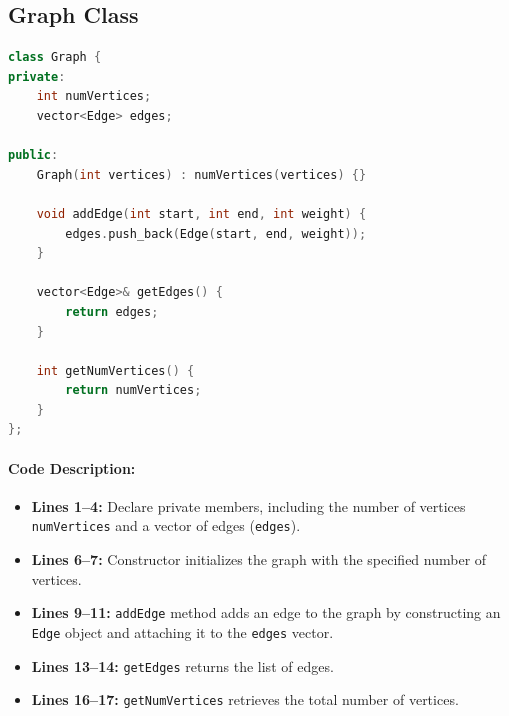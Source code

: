 \documentclass[a4paper,12pt]{article}
\begin{document}
\subsection{Graph Class}
\begin{lstlisting}[language=C++, caption=Graph Class Definition]
class Graph {
private:
    int numVertices;
    vector<Edge> edges;

public:
    Graph(int vertices) : numVertices(vertices) {}

    void addEdge(int start, int end, int weight) {
        edges.push_back(Edge(start, end, weight));
    }

    vector<Edge>& getEdges() {
        return edges;
    }

    int getNumVertices() {
        return numVertices;
    }
};
\end{lstlisting}

\paragraph{Code Description:}
\begin{itemize}
    \item \textbf{Lines 1--4:} Declare private members, including the number of vertices \texttt{numVertices} and a vector of edges (\texttt{edges}).
    \item \textbf{Lines 6--7:} Constructor initializes the graph with the specified number of vertices.
    \item \textbf{Lines 9--11:} \texttt{addEdge} method adds an edge to the graph by constructing an \texttt{Edge} object and attaching it to the \texttt{edges} vector.
    \item \textbf{Lines 13--14:} \texttt{getEdges} returns the list of edges.
    \item \textbf{Lines 16--17:} \texttt{getNumVertices} retrieves the total number of vertices.
\end{itemize}
\end{document}
